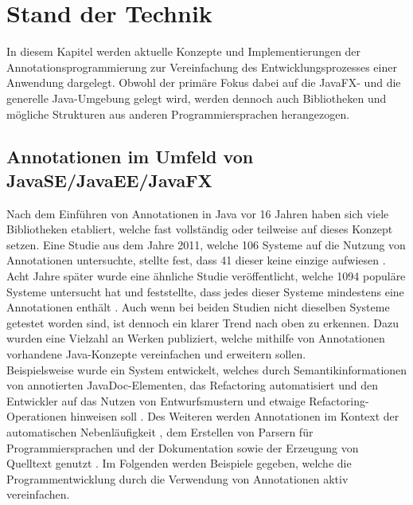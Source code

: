 \chapter{Stand der Technik}
\label{stand_der_technik}
\noindent In diesem Kapitel werden aktuelle Konzepte und Implementierungen der Annotationsprogrammierung zur Vereinfachung des Entwicklungsprozesses einer Anwendung dargelegt. Obwohl der primäre Fokus dabei auf die JavaFX- und die generelle Java-Umgebung gelegt wird, werden dennoch auch Bibliotheken und mögliche Strukturen aus anderen Programmiersprachen herangezogen.

\section{Annotationen im Umfeld von JavaSE/JavaEE/JavaFX}
\label{verwendung_im_umfeld_von_java}
Nach dem Einführen von Annotationen in Java vor 16 Jahren haben sich viele Bibliotheken etabliert, welche fast vollständig oder teilweise auf dieses Konzept setzen. Eine Studie aus dem Jahre 2011, welche 106 Systeme auf die Nutzung von Annotationen untersuchte, stellte fest, dass 41 dieser keine einzige aufwiesen \cite{Rocha2011}. Acht Jahre später wurde eine ähnliche Studie veröffentlicht, welche 1094 populäre Systeme untersucht hat und feststellte, dass jedes dieser Systeme mindestens eine Annotationen enthält \cite{Yu2019}. Auch wenn bei beiden Studien nicht dieselben Systeme getestet worden sind, ist dennoch ein klarer Trend nach oben zu erkennen. Dazu wurden eine Vielzahl an Werken publiziert, welche mithilfe von Annotationen vorhandene Java-Konzepte vereinfachen und erweitern sollen.\\
Beispielsweise wurde ein System entwickelt, welches durch Semantikinformationen von annotierten JavaDoc-Elementen, das Refactoring automatisiert und den Entwickler auf das Nutzen von Entwurfsmustern und etwaige Refactoring-Operationen hinweisen soll \cite{Meffert2006}. Des Weiteren werden Annotationen im Kontext der automatischen Nebenläufigkeit \cite{Danelutto2007}, dem Erstellen von Parsern für Programmiersprachen \cite{Porubaen2009} und der Dokumentation sowie der Erzeugung von Quelltext genutzt \cite{Sulir2016, Miroslav2009}.
Im Folgenden werden Beispiele gegeben, welche die Programmentwicklung durch die Verwendung von Annotationen aktiv vereinfachen.
